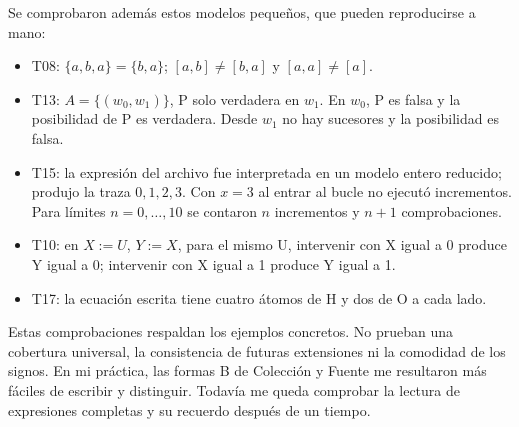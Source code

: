Se comprobaron además estos modelos pequeños, que pueden reproducirse a mano:
\begin{itemize}
\item T08: $\{a,b,a\}=\{b,a\}$; $[a,b]\ne[b,a]$ y $[a,a]\ne[a]$.
\item T13: $A=\{(w_0,w_1)\}$, P solo verdadera en $w_1$. En $w_0$, P es falsa
y la posibilidad de P es verdadera. Desde $w_1$ no hay sucesores y la posibilidad es falsa.
\item T15: la expresión del archivo fue interpretada en un modelo entero reducido;
produjo la traza $0,1,2,3$. Con $x=3$ al entrar al bucle no ejecutó incrementos.
Para límites $n=0,\ldots,10$ se contaron $n$ incrementos y $n+1$ comprobaciones.
\item T10: en $X:=U$, $Y:=X$, para el mismo U, intervenir con X igual a 0
produce Y igual a 0; intervenir con X igual a 1 produce Y igual a 1.
\item T17: la ecuación escrita tiene cuatro átomos de H y dos de O a cada lado.
\end{itemize}
Estas comprobaciones respaldan los ejemplos concretos. No prueban una cobertura
universal, la consistencia de futuras extensiones ni la comodidad de los signos.
En mi práctica, las formas B de Colección y Fuente me resultaron más fáciles
de escribir y distinguir. Todavía me queda comprobar la lectura de expresiones
completas y su recuerdo después de un tiempo.
